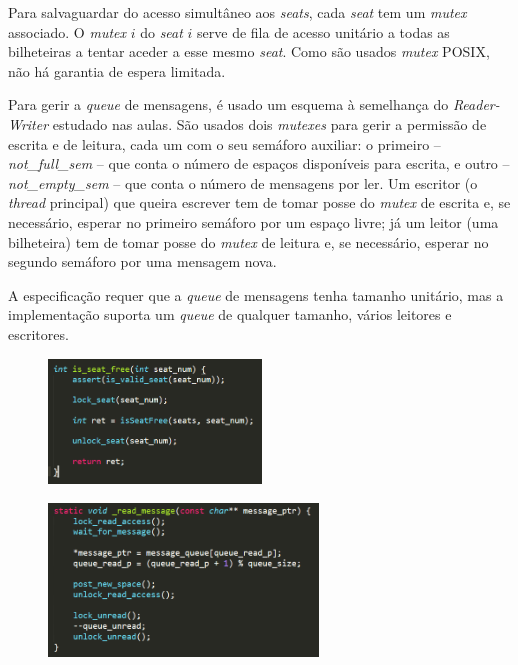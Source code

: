 \documentclass[11pt,a4paper,notitlepage]{article}
\begin{document}
Para salvaguardar do acesso simultâneo aos \emph{seats},
cada \emph{seat} tem um \emph{mutex} associado. O \emph{mutex} $i$
do \emph{seat} $i$ serve de fila de acesso unitário a todas
as bilheteiras a tentar aceder a esse mesmo \emph{seat}.
Como são usados \emph{mutex} POSIX, não há garantia de espera
limitada.

Para gerir a \emph{queue} de mensagens, é usado um esquema
à semelhança do \textit{Reader-Writer} estudado nas aulas.
São usados dois \emph{mutexes} para gerir a permissão de
escrita e de leitura, cada um com o seu semáforo auxiliar:
o primeiro -- \emph{not\_full\_sem} -- que conta o número de
espaços disponíveis para escrita, e outro -- \emph{not\_empty\_sem}
-- que conta o número de mensagens por ler. Um escritor
(o \emph{thread} principal) que queira escrever tem de tomar
posse do \emph{mutex} de escrita e, se necessário, esperar
no primeiro semáforo por um espaço livre; já um leitor (uma bilheteira)
tem de tomar posse do \emph{mutex} de leitura e, se necessário,
esperar no segundo semáforo por uma mensagem nova.

A especificação requer que a \emph{queue} de mensagens
tenha tamanho unitário, mas a implementação
suporta um \emph{queue} de qualquer tamanho,
vários leitores e escritores.\\

\begin{figure}[htbp]
\centering
\begin{minipage}{.5\textwidth}
\centering
\label{fig:ans}
\includegraphics[height=9em]{is_seat_free.png}
\end{minipage}%
\begin{minipage}{.5\textwidth}
\centering
\label{fig:ans}
\includegraphics[height=11em]{read_message.png}
\end{minipage}
\end{figure}
\end{document}
